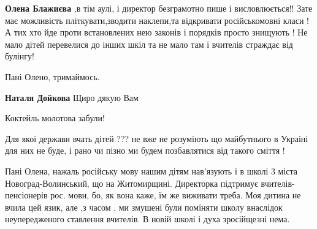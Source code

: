 \begin{itemize}
\begin{itemize}
\textbf{Олена Блажиєва} ,в тім аулі, і директор безграмотно пише і
висловлюється!! Зате має можливість пліткувати,зводити наклепи,та відкривати
російськомовні класи ! А тих хто йде проти встановлених нею законів і порядків
просто знищують ! Не мало дітей перевелися до інших шкіл та не мало там і
вчителів страждає від булінгу!

\end{itemize}

 
Пані Олено, тримаймось.

\begin{itemize}
 
\textbf{Наталя Дойкова} Щиро дякую Вам
\end{itemize}

 
Коктейль молотова забули!

 

Для якоі держави вчать дітей ??? не вже не розуміють що майбутнього в Украіні
для них не буде, і рано чи пізно ми будем позбавлятися від такого сміття !

 

Пані Олена, нажаль російську мову нашим дітям нав'язують і в школі 3 міста
Новоград-Волинський, що на Житомирщині. Директорка підтримує
вчителів-пенсіонерів рос. мови, бо, як вона каже, їм же виживати треба. Моя
дитина не вчила цей язик, але ,з часом , ми змушені були поміняти школу
внаслідок неупередженого ставлення вчителів. В новій школі і духа зросійщезні
нема.



\end{itemize}
